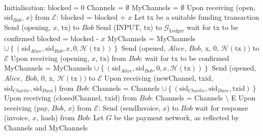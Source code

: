 \ \\ 
  \label{alg:lightningprot}
  \begin{algorithmic}[1]
    \State Initialisation:
      \State $\mathrm{blocked} = 0$
      \State Channels = $\emptyset$
      \State MyChannels = $\emptyset$
    \State
    \State Upon receiving (open, $\mathrm{sid}_{Bob}$, $x$) from $\mathcal{E}$:
        \State blocked = blocked + $x$
        \State Let tx be a suitable funding transaction
        \State Send (opening, $x$, tx) to $Bob$
        \State Send (INPUT, tx) to $\mathcal{G}_{\mathrm{Ledger}}$
        \State wait for tx to be confirmed 
        \State blocked = blocked - $x$
        \State MyChannels = MyChannels $\cup \left\{\left(\mathrm{sid}_{Alice},
        \mathrm{sid}_{Bob}, x, 0, \mathcal{H}\left(\mathrm{tx}\right)\right)\right\}$
        \State Send (opened, $Alice$, $Bob$, x, 0, $\mathcal{H}\left(\mathrm{tx}\right))$
        to $\mathcal{E}$
      \EndIf
    \State
    \State Upon receiving (opening, $x$, tx) from $Bob$:
      \State wait for tx to be confirmed
      \State MyChannels = MyChannels $\cup \left\{\left(\mathrm{sid}_{Alice},
      \mathrm{sid}_{Bob}, 0, x, \mathcal{H}\left(\mathrm{tx}\right)\right)\right\}$
      \State Send (opened, $Alice$, $Bob$, 0, x, $\mathcal{H}\left(\mathrm{tx}\right))$ to
      $\mathcal{E}$
    \State
    \State Upon receiving (newChannel, txid, $\mathrm{sid}_{Charlie},
    \mathrm{sid}_{Dave}$) from $Bob$:
        \State Channels = Channels $\cup \left\{\left(\mathrm{sid}_{Charlie},
        \mathrm{sid}_{Dave}, \mathrm{txid}\right)\right\}$
      \EndIf
    \State
    \State Upon receiving (closedChannel, txid) from $Bob$:
        \State Channels = Channels $\setminus$ E
      \EndIf
    \State
    \State Upon receiving (pay, $Bob$, $x$) from $\mathcal{E}$:
      \State Send (sendInvoice, $x$) to $Bob$
      \State wait for response (invoice, $x$, hash) from $Bob$:
      \State Let $G$ be the payment network, as reflected by Channels and MyChannels
\end{algorithmic}
